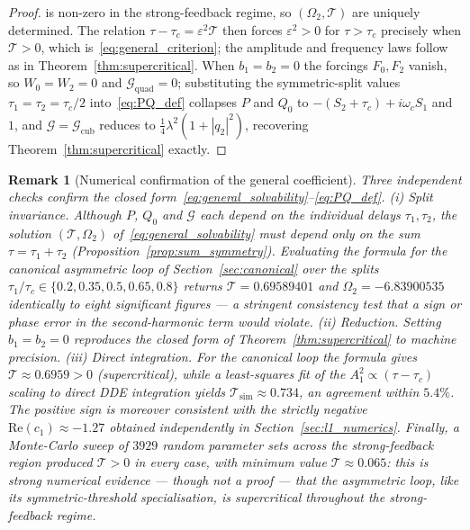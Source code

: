\documentclass[sn-mathphys,Numbered]{sn-jnl}
\theoremstyle{thmstyleone}
\theoremstyle{thmstyletwo}
\theoremstyle{thmstylethree}
\newtheorem{remark}{Remark}
\begin{document}
\begin{proof}
is non-zero in the strong-feedback regime, so $(\Omega_2,\mathcal{T})$ are
uniquely determined. The relation $\tau-\tau_c=\varepsilon^{2}\mathcal{T}$ then
forces $\varepsilon^{2}>0$ for $\tau>\tau_c$ precisely when $\mathcal{T}>0$,
which is~\eqref{eq:general_criterion}; the amplitude and frequency laws
follow as in Theorem~\ref{thm:supercritical}. When $b_1=b_2=0$ the
forcings $F_0,F_2$ vanish, so $W_0=W_2=0$ and
$\mathcal{G}_{\mathrm{quad}}=0$; substituting the symmetric-split
values $\tau_1=\tau_2=\tau_c/2$ into~\eqref{eq:PQ_def} collapses $P$ and
$Q_0$ to $-(S_2+\tau_c)+i\omega_c S_1$ and $1$, and
$\mathcal{G}=\mathcal{G}_{\mathrm{cub}}$ reduces to
$\tfrac14\lambda^{2}(1+|q_2|^{2})$, recovering
Theorem~\ref{thm:supercritical} exactly.
\end{proof}

\begin{remark}[Numerical confirmation of the general coefficient]
\label{rem:general_verification}
Three independent checks confirm the closed
form~\eqref{eq:general_solvability}--\eqref{eq:PQ_def}.
\emph{(i) Split invariance.} Although $P$, $Q_0$ and $\mathcal{G}$ each
depend on the individual delays $\tau_1,\tau_2$, the solution
$(\mathcal{T},\Omega_2)$ of~\eqref{eq:general_solvability} must depend only on the
sum $\tau=\tau_1+\tau_2$ (Proposition~\ref{prop:sum_symmetry}). Evaluating
the formula for the canonical asymmetric loop of
Section~\ref{sec:canonical} over the splits
$\tau_1/\tau_c\in\{0.2,0.35,0.5,0.65,0.8\}$ returns
$\mathcal{T}=0.69589401$ and $\Omega_2=-6.83900535$ \emph{identically to eight
significant figures} --- a stringent consistency test that a sign or
phase error in the second-harmonic term would violate.
\emph{(ii) Reduction.} Setting $b_1=b_2=0$ reproduces the closed form of
Theorem~\ref{thm:supercritical} to machine precision.
\emph{(iii) Direct integration.} For the canonical loop the formula gives
$\mathcal{T}\approx0.6959>0$ (supercritical), while a least-squares fit of the
$A_1^{2}\propto(\tau-\tau_c)$ scaling to direct DDE integration yields
$\mathcal{T}_{\mathrm{sim}}\approx0.734$, an agreement within $5.4\%$. The
positive sign is moreover consistent with the strictly negative
$\mathrm{Re}(c_1)\approx-1.27$ obtained independently in
Section~\ref{sec:l1_numerics}. Finally, a Monte-Carlo sweep of $3929$
random parameter sets across the strong-feedback region produced
$\mathcal{T}>0$ in \emph{every} case, with minimum value $\mathcal{T}\approx0.065$: this is
strong numerical evidence --- though not a proof --- that the asymmetric
loop, like its symmetric-threshold specialisation, is supercritical
throughout the strong-feedback regime.
\end{remark}
\end{document}
